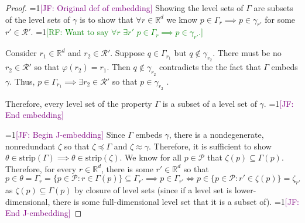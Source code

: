 \documentclass[12pt]{article}
\newcommand{\Comments}{1}
\newcommand{\mynote}[2]{\ifnum\Comments=1\textcolor{#1}{#2}\fi}
\newcommand{\raf}[1]{\mynote{green}{[RF: #1]}}
\newcommand{\jessie}[1]{\mynote{purple}{[JF: #1]}}
\newcommand{\reals}{\mathbb{R}}
\renewcommand{\P}{\mathcal{P}}
\newcommand{\R}{\mathcal{R}}
\newcommand{\strip}{\mathrm{strip}}
\begin{document}
\begin{proof}
	\jessie{Original def of embedding}
	Showing the level sets of $\Gamma$ are subsets of the level sets of $\gamma$ is to show that $\forall r \in \reals^d$ we know $p \in \Gamma_r \implies p \in \gamma_{r'}$ for some $r' \in \R'$.
    \raf{Want to say $\forall r$ $\exists r'$ $p \in \Gamma_r \implies p \in \gamma_{r'}$.}
    
	Consider $r_1 \in \reals^d$ and $r_2 \in \R'$.
	Suppose $q \in \Gamma_{r_1}$ but $q \not \in \gamma_{r_2}$.
	There must be no $r_2 \in \R'$ so that $\varphi(r_2) = r_1$.
	Then $q \not \in \gamma_{r_2}$ contradicts the the fact that $\Gamma$ embeds $\gamma$.
	Thus, $p \in \Gamma_{r_1} \implies \exists r_2 \in \R'$ so that $p \in \gamma_{r_2}$ .
	
	Therefore, every level set of the property $\Gamma$ is a subset of a level set of $\gamma$.
	\jessie{End embedding}
	
	\jessie{Begin J-embedding}
	Since $\Gamma$ embeds $\gamma$, there is a nondegenerate, nonredundant $\zeta$ so that $\zeta \preceq \Gamma$ and $\zeta \approx \gamma$.
	Therefore, it is sufficient to show $\theta \in \strip(\Gamma) \implies \theta \in \strip(\zeta)$.
	We know for all $p \in \P$ that $\zeta(p) \subseteq \Gamma(p)$.
	Therefore, for every $r \in \reals^d$, there is some $r' \in \reals^d$ so that $ p \in \theta = \Gamma_r = \{ p \in \P : r \in \Gamma(p) \} \subseteq \Gamma_{r'} \implies p \in \Gamma_{r'} \iff p \in \{ p \in \P : r' \in \zeta(p) \} = \zeta_{r'}$ as $\zeta(p) \subseteq \Gamma(p)$ by closure of level sets (since if a level set is lower-dimensional, there is some full-dimensional level set that it is a subset of).
	\jessie{End J-embedding}
\end{proof}
\end{document}
